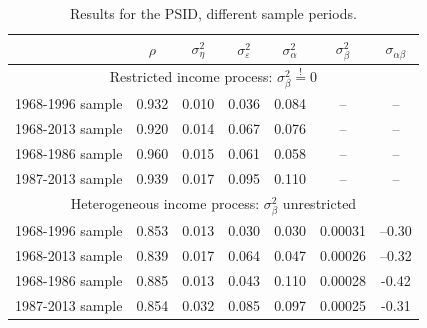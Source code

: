 \begin{table}%
\begin{tabular}{l|cccccc}
                    &$\rho$ & $\sigma^2_{\eta}$&$\sigma^2_{\varepsilon}$&$\sigma^2_{\alpha}$&$\sigma^2_{\beta}$&$\sigma_{\alpha \beta}$\\
\hline
\hline 
\multicolumn{7}{c}{Restricted income process: $\sigma^2_{\beta} \stackrel{!}{=} 0$} \\
1968-1996 sample & 0.932 &  0.010           &   0.036                &       0.084       &        --        &        --             \\
1968-2013 sample & 0.920 &  0.014           &   0.067                &       0.076       &        --        &        --             \\
1968-1986 sample & 0.960 &  0.015           &   0.061                &       0.058       &        --        &        --             \\
1987-2013 sample & 0.939 &  0.017           &   0.095                &       0.110       &        --        &        --             \\
\hline
\multicolumn{7}{c}{Heterogeneous income process: $\sigma^2_{\beta}$ unrestricted} \\
\hline
1968-1996 sample & 0.853 &  0.013           &   0.030                &   0.030           &     0.00031      &     --0.30            \\
1968-2013 sample & 0.839 &  0.017           &   0.064                &   0.047           &     0.00026      &     --0.32            \\
1968-1986 sample & 0.885 &  0.013           &   0.043                &       0.110       &      0.00028     &      -0.42            \\
1987-2013 sample & 0.854 &  0.032           &   0.085                &       0.097       &      0.00025     &      -0.31            \\
\hline
\end{tabular}
\caption{Results for the PSID, different sample periods.}
\label{tab:PSID_results}
\end{table}
